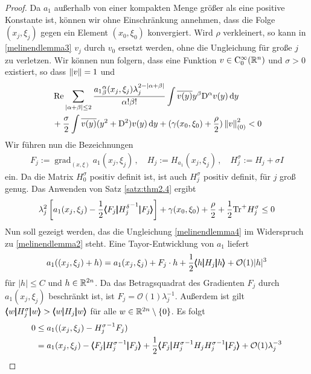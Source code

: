 \begin{proof}
Da $a_1$ außerhalb von einer kompakten Menge größer als eine positive Konstante ist, können wir ohne Einschränkung annehmen, dass die Folge $(x_j,\xi_j)$ gegen ein Element $(x_0,\xi_0)$ konvergiert.
Wird $\rho$ verkleinert, so kann in \eqref{melinendlemma3} $v_j$ durch $v_0$ ersetzt werden, ohne die Ungleichung für große $j$ zu verletzen.
Wir können nun folgern, dass eine Funktion $v\in\mathrm C^\infty_0(\mathbb R^n)$ und $\sigma>0$ existiert, so dass $\left\lVert v\right\rVert =1$ und
\begin{align}
&\operatorname{Re} \sum_{|\alpha+\beta|\le 2} \frac{{a_1}^\alpha_\beta(x_j,\xi_j)\lambda_j^{2-|\alpha+\beta|}}{\alpha!\beta!}\int\overline{v(y)}y^\beta\mathrm D^\alpha v(y)\,\mathrm d y\\
& + \frac \sigma 2 \int \overline{v(y)}(y^2 + \mathrm D^2)v(y) \,\mathrm d y+ (\gamma(x_0,\xi_0)+ \frac\rho 2)\left\lVert v\right\rVert _{(0)}^2 < 0
\end{align}
Wir führen nun die Bezeichnungen
\begin{align}
F_j := \operatorname{grad}_{(x,\xi)}a_1(x_j,\xi_j)\,,\quad H_j:=H_{a_1}(x_j,\xi_j)\,,\quad H_j^\sigma:=H_j  + \sigma I
\end{align}
ein. Da die Matrix $H_0^\sigma$ positiv definit ist, ist auch $H_j^\sigma$ positiv definit, für $j$ groß genug. Das Anwenden von Satz \ref{satz:thm2.4} ergibt
\begin{align}\label{melinendlemma4}
\lambda_j^2\left[ a_1(x_j,\xi_j) - \frac{1}{2}\pmb\langle F_j\pmb|{H_j^\delta}^{-1}\pmb|F_j\pmb\rangle \right] + \gamma(x_0,\xi_0) + \frac \rho 2 + \frac 1 2 \mathrm{Tr}^+ H_j^\sigma\le 0
\end{align}
Nun soll gezeigt werden, das die Ungleichung \eqref{melinendlemma4} im Widerspruch zu \eqref{melinendlemma2} steht. Eine Tayor-Entwicklung von $a_1$ liefert
\begin{align}
a_1((x_j,\xi_j) + h ) = a_1(x_j,\xi_j) + F_j\cdot h + \frac 1 2 \pmb\langle h\pmb|H_j\pmb|h\pmb\rangle + \mathcal O(1)|h|^3
\end{align}
für $|h|\le C$ und $h\in\mathbb R^{2n}$. Da das Betragsquadrat des Gradienten $F_j$ durch $a_1(x_j,\xi_j)$ beschränkt ist, ist $F_j=\mathcal O(1)\lambda_j^{-1}$. Außerdem ist gilt $\pmb\langle w\pmb|H_j^\sigma\pmb|w\pmb\rangle>\pmb\langle w\pmb|H_j\pmb|w\pmb\rangle$ für alle $w\in\mathbb R^{2n}\setminus\{0\}$. Es folgt
\begin{align}
0&\le a_1((x_j,\xi_j)- {H_j^\sigma}^{-1}F_j) \\&= a_1(x_j,\xi_j) - \cspro{F_j}{{H_j^\sigma}^{-1}}{F_j} + \frac 1 2\cspro{F_j}{{H_j^\sigma}^{-1}H_j{H_j^\sigma}^{-1}}{F_j} + \mathcal O(1)\lambda_j^{-3}\\

\end{align}
\end{proof}
